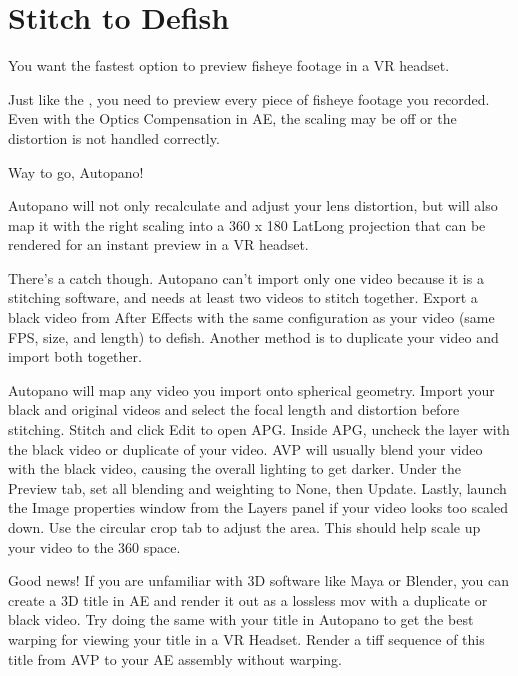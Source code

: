 \section{Stitch to Defish}
\pagecolor{white}
\label{chap:52}
\begin{fullwidth}

\problem

{\large You want the fastest option to preview fisheye footage in a VR headset. \par}

Just like the \textbf{}, you need to preview every piece of fisheye footage you recorded. Even with the Optics Compensation in AE, the scaling may be off or the distortion is not handled correctly.

\solution

{\large Way to go, Autopano! \par}

Autopano will not only recalculate and adjust your lens distortion, but will also map it with the right scaling into a 360 x 180 LatLong projection that can be rendered for an instant preview in a VR headset.

There’s a catch though. Autopano can’t import only one video because it is a stitching software, and needs at least two videos to stitch together. Export a black video from After Effects with the same configuration as your video (same FPS, size, and length) to defish. Another method is to duplicate your video and import both together.


Autopano will map any video you import onto spherical geometry. Import your black and original videos and select the focal length and distortion before stitching. Stitch and click Edit to open APG. Inside APG, uncheck the layer with the black video or duplicate of your video. AVP will usually blend your video with the black video, causing the overall lighting to get darker. Under the Preview tab, set all blending and weighting to None, then Update. Lastly, launch the Image properties window from the Layers panel if your video looks too scaled down. Use the circular crop tab to adjust the area. This should help scale up your video to the 360 space.




Good news! If you are unfamiliar with 3D software like Maya or Blender, you can create a 3D title in AE and render it out as a lossless mov with a duplicate or black video. Try doing the same with your title in Autopano to get the best warping for viewing your title in a VR Headset. Render a tiff sequence of this title from AVP to your AE assembly without warping.


\clearpage
\end{fullwidth}